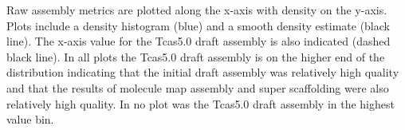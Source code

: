 Raw assembly metrics are plotted along the x-axis with density on the y-axis. Plots include a density histogram (blue) and a smooth density estimate (black line). The x-axis value for the Tcas5.0 draft assembly is also indicated (dashed black line).
In all plots the Tcas5.0 draft assembly is on the higher end of the distribution indicating that the initial draft assembly was relatively high quality and that the results of molecule map assembly and super scaffolding were also relatively high quality. In no plot was the Tcas5.0 draft assembly in the highest value bin.